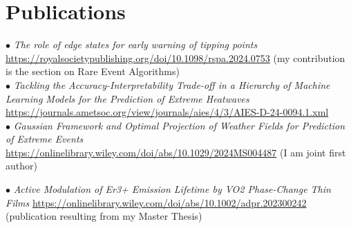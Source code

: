 \documentclass[11pt, a4 paper]{article}
\newcommand{\bu}{$\bullet$ }
\begin{document}
\section*{Publications}
  \begin{description}[style=multiline,leftmargin=3cm,align=right]
    \item[2025]
    \bu \emph{The role of edge states for early warning of tipping points} \url{https://royalsocietypublishing.org/doi/10.1098/rspa.2024.0753} (my contribution is the section on Rare Event Algorithms) \\
    \bu \emph{Tackling the Accuracy-Interpretability Trade-off in a Hierarchy of Machine Learning Models for the Prediction of Extreme Heatwaves} \url{https://journals.ametsoc.org/view/journals/aies/4/3/AIES-D-24-0094.1.xml} \\
    \bu \emph{Gaussian Framework and Optimal Projection of Weather Fields for Prediction of Extreme Events} \url{https://onlinelibrary.wiley.com/doi/abs/10.1029/2024MS004487} (I am joint first author)
    \item[2023]
    \bu \emph{Active Modulation of Er3+ Emission Lifetime by VO2 Phase-Change Thin Films} \url{https://onlinelibrary.wiley.com/doi/abs/10.1002/adpr.202300242} (publication resulting from my Master Thesis)
  \end{description}
\end{document}

